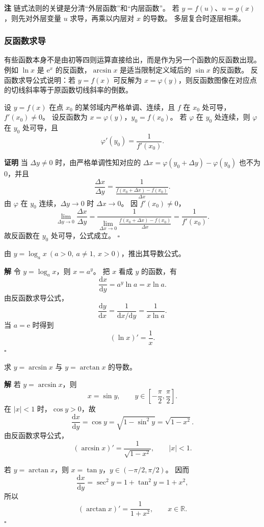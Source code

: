 \documentclass[fontset=fandol]{ctexart}
\newenvironment{proofdetail}{\par\noindent\textbf{证明}\quad}{\hfill$\square$\par\vspace{0.8em}}
\newenvironment{solution}{\par\noindent\textbf{解}\quad}{\hfill$\square$\par\vspace{0.8em}}
\newenvironment{remark}{\par\noindent\textbf{注}\quad}{\par\vspace{0.8em}}
\newcommand{\dd}{\mathrm{d}}
\newcommand{\ee}{\mathrm{e}}
\newcommand{\RR}{\mathbb{R}}
\begin{document}
\begin{remark}
链式法则的关键是分清“外层函数”和“内层函数”。 若 $y=f(u)$、$u=g(x)$，则先对外层变量 $u$ 求导，再乘以内层对 $x$ 的导数。 多层复合时逐层相乘。
\end{remark}





\subsubsection*{反函数求导}

有些函数本身不是由初等四则运算直接给出，而是作为另一个函数的反函数出现。 例如 $\ln x$ 是 $\ee^x$ 的反函数，$\arcsin x$ 是适当限制定义域后的 $\sin x$ 的反函数。 反函数求导公式说明：若 $y=f(x)$ 可反解为 $x=\varphi(y)$，则反函数图像在对应点的切线斜率等于原函数切线斜率的倒数。

\begin{theorem}[反函数求导公式]
设 $y=f(x)$ 在点 $x_0$ 的某邻域内严格单调、连续，且 $f$ 在 $x_0$ 处可导，$f'(x_0)\neq0$。 设反函数为 $x=\varphi(y)$，$y_0=f(x_0)$。 若 $\varphi$ 在 $y_0$ 处连续，则 $\varphi$ 在 $y_0$ 处可导，且
\[
\varphi'(y_0)=\frac{1}{f'(x_0)}.
\]
\end{theorem}
\begin{proofdetail}
当 $\Delta y\neq0$ 时，由严格单调性知对应的 $\Delta x=\varphi(y_0+\Delta y)-\varphi(y_0)$ 也不为 $0$，并且
\[
\frac{\Delta x}{\Delta y}
=\frac{1}{\frac{f(x_0+\Delta x)-f(x_0)}{\Delta x}}.
\]
由 $\varphi$ 在 $y_0$ 连续，$\Delta y\to0$ 时 $\Delta x\to0$。 因 $f'(x_0)\neq0$，
\[
\lim_{\Delta y\to0}\frac{\Delta x}{\Delta y}
=\frac{1}{\lim_{\Delta x\to0}\frac{f(x_0+\Delta x)-f(x_0)}{\Delta x}}
=\frac1{f'(x_0)}.
\]
故反函数在 $y_0$ 处可导，公式成立。
\end{proofdetail}

\begin{example}[由反函数推出对数函数导数]
由 $y=\log_a x\ (a>0,\ a\neq1,\ x>0)$，推出其导数公式。
\end{example}
\begin{solution}
令 $y=\log_a x$，则 $x=a^y$。 把 $x$ 看成 $y$ 的函数，有
\[
\frac{\dd x}{\dd y}=a^y\ln a=x\ln a.
\]
由反函数求导公式，
\[
\frac{\dd y}{\dd x}
=\frac{1}{\dd x/\dd y}
=\frac{1}{x\ln a}.
\]
当 $a=\ee$ 时得到
\[
(\ln x)'=\frac1x.
\]
\end{solution}

\begin{example}[反三角函数导数]
求 $y=\arcsin x$ 与 $y=\arctan x$ 的导数。
\end{example}
\begin{solution}
若 $y=\arcsin x$，则
\[
x=\sin y,\qquad y\in\left[-\frac{\pi}{2},\frac{\pi}{2}\right].
\]
在 $|x|<1$ 时，$\cos y>0$，故
\[
\frac{\dd x}{\dd y}=\cos y=\sqrt{1-\sin^2y}=\sqrt{1-x^2}.
\]
由反函数求导公式，
\[
(\arcsin x)'=\frac{1}{\sqrt{1-x^2}},\qquad |x|<1.
\]

若 $y=\arctan x$，则 $x=\tan y$，$y\in(-\pi/2,\pi/2)$。 因而
\[
\frac{\dd x}{\dd y}=\sec^2y=1+\tan^2y=1+x^2,
\]
所以
\[
(\arctan x)'=\frac1{1+x^2},\qquad x\in\RR.
\]
\end{solution}
\end{document}
